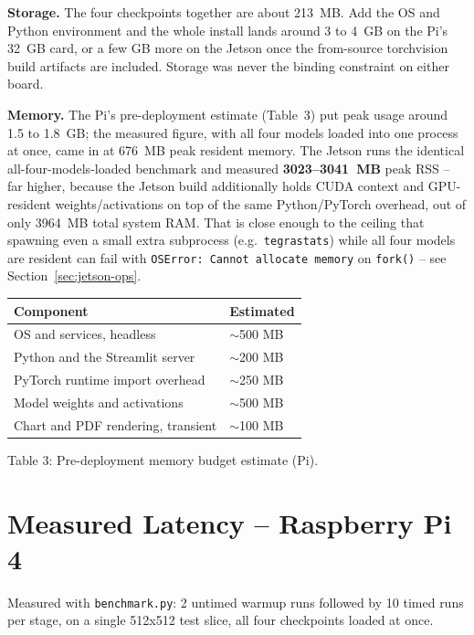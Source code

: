 \documentclass[11pt]{article}
\begin{document}
\textbf{Storage.} The four checkpoints together are about 213~MB. Add the OS and Python
environment and the whole install lands around 3 to 4~GB on the Pi's 32~GB card, or a
few GB more on the Jetson once the from-source torchvision build artifacts are included.
Storage was never the binding constraint on either board.

\textbf{Memory.} The Pi's pre-deployment estimate (Table~3) put peak usage around 1.5 to
1.8~GB; the measured figure, with all four models loaded into one process at once, came
in at 676~MB peak resident memory. The Jetson runs the identical all-four-models-loaded
benchmark and measured \textbf{3023--3041~MB} peak RSS -- far higher, because the Jetson
build additionally holds CUDA context and GPU-resident weights/activations on top of the
same Python/PyTorch overhead, out of only 3964~MB total system RAM. That is close enough
to the ceiling that spawning even a small extra subprocess (e.g.\ \texttt{tegrastats})
while all four models are resident can fail with \texttt{OSError: Cannot allocate memory}
on \texttt{fork()} -- see Section~\ref{sec:jetson-ops}.

\begin{center}
\begin{tabular}{ll}
\toprule
Component & Estimated \\
\midrule
OS and services, headless & $\sim$500 MB \\
Python and the Streamlit server & $\sim$200 MB \\
PyTorch runtime import overhead & $\sim$250 MB \\
Model weights and activations & $\sim$500 MB \\
Chart and PDF rendering, transient & $\sim$100 MB \\
\bottomrule
\end{tabular}
\end{center}
\begin{center}\small Table 3: Pre-deployment memory budget estimate (Pi).\end{center}

\section{Measured Latency -- Raspberry Pi 4}
\label{sec:pi-latency}

Measured with \texttt{benchmark.py}: 2 untimed warmup runs followed by 10 timed runs per
stage, on a single 512x512 test slice, all four checkpoints loaded at once.
\end{document}
